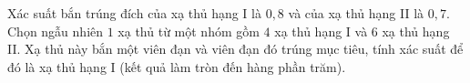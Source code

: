 \begin{bt}%
	Xác suất bắn trúng đích của xạ thủ hạng I là  $0{,}8$ và của xạ thủ hạng II là $0{,}7$. Chọn ngẫu nhiên $1$ xạ thủ từ một nhóm gồm $4$ xạ thủ hạng I và $6$ xạ thủ hạng II. Xạ thủ này bắn một viên đạn và viên đạn đó trúng mục tiêu, tính xác suất để đó là xạ thủ hạng I (kết quả làm tròn đến hàng phần trăm).
\end{bt}
